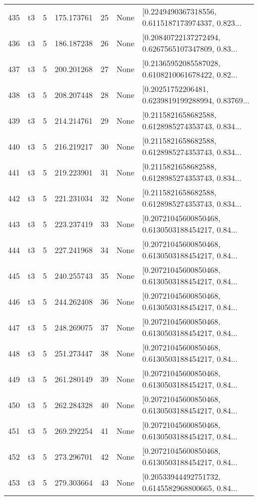 \begin{tabular}{lllrlll}
435 &  t3 &   5 &  175.173761 &   25 &  None &  [0.2249490367318556, 0.6115187173974337, 0.823... \\
436 &  t3 &   5 &  186.187238 &   26 &  None &  [0.20840722137272494, 0.6267565107347809, 0.83... \\
437 &  t3 &   5 &  200.201268 &   27 &  None &  [0.21365952085587028, 0.6108210061678422, 0.82... \\
438 &  t3 &   5 &  208.207448 &   28 &  None &  [0.20251752206481, 0.6239819199288994, 0.83769... \\
439 &  t3 &   5 &  214.214761 &   29 &  None &  [0.2115821658682588, 0.6128985274353743, 0.834... \\
440 &  t3 &   5 &  216.219217 &   30 &  None &  [0.2115821658682588, 0.6128985274353743, 0.834... \\
441 &  t3 &   5 &  219.223901 &   31 &  None &  [0.2115821658682588, 0.6128985274353743, 0.834... \\
442 &  t3 &   5 &  221.231034 &   32 &  None &  [0.2115821658682588, 0.6128985274353743, 0.834... \\
443 &  t3 &   5 &  223.237419 &   33 &  None &  [0.20721045600850468, 0.6130503188454217, 0.84... \\
444 &  t3 &   5 &  227.241968 &   34 &  None &  [0.20721045600850468, 0.6130503188454217, 0.84... \\
445 &  t3 &   5 &  240.255743 &   35 &  None &  [0.20721045600850468, 0.6130503188454217, 0.84... \\
446 &  t3 &   5 &  244.262408 &   36 &  None &  [0.20721045600850468, 0.6130503188454217, 0.84... \\
447 &  t3 &   5 &  248.269075 &   37 &  None &  [0.20721045600850468, 0.6130503188454217, 0.84... \\
448 &  t3 &   5 &  251.273447 &   38 &  None &  [0.20721045600850468, 0.6130503188454217, 0.84... \\
449 &  t3 &   5 &  261.280149 &   39 &  None &  [0.20721045600850468, 0.6130503188454217, 0.84... \\
450 &  t3 &   5 &  262.284328 &   40 &  None &  [0.20721045600850468, 0.6130503188454217, 0.84... \\
451 &  t3 &   5 &  269.292254 &   41 &  None &  [0.20721045600850468, 0.6130503188454217, 0.84... \\
452 &  t3 &   5 &  273.296701 &   42 &  None &  [0.20721045600850468, 0.6130503188454217, 0.84... \\
453 &  t3 &   5 &  279.303664 &   43 &  None &  [0.20533944492751732, 0.6145582968800665, 0.84... \\

\end{tabular}
